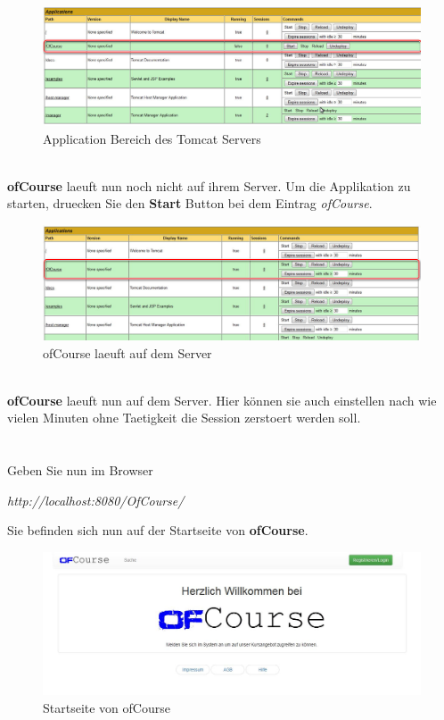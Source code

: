 \documentclass[a4paper, 12pt]{scrreprt}
\begin{document}
\begin{figure}[h]
\centering
\includegraphics[width=0.8\linewidth]{Grafiken/ApplicationBereichServerDeployed}
\caption{Application Bereich des Tomcat Servers}
\label{fig:ApplicationBereichServerDeployed}
\end{figure}
\ \\
\textbf{ofCourse} laeuft nun noch nicht auf ihrem Server. Um die Applikation zu starten, druecken Sie den \textbf{Start} Button bei dem Eintrag {\it ofCourse}.
\begin{figure}[h]
\centering
\includegraphics[width=0.8\linewidth]{Grafiken/ofCourseDeployed}
\caption{ofCourse laeuft auf dem Server}
\label{fig:OfCourseDeployed}
\end{figure}
\\ 
\textbf{ofCourse} laeuft nun auf dem Server. Hier können sie auch einstellen nach wie vielen Minuten ohne Taetigkeit die Session zerstoert werden soll.\ \\
\ \\
\newpage
\ \\
Geben Sie nun im Browser 
\begin{center}
	{\it http://localhost:8080/OfCourse/}
\end{center}
Sie befinden sich nun auf der Startseite von \textbf{ofCourse}.
\begin{figure}[h]
	\centering
	\includegraphics[width=0.8\linewidth]{Grafiken/indexPage}
	\caption[]{Startseite von ofCourse}
	\label{fig:indexPage1}
\end{figure} 
\end{document}
